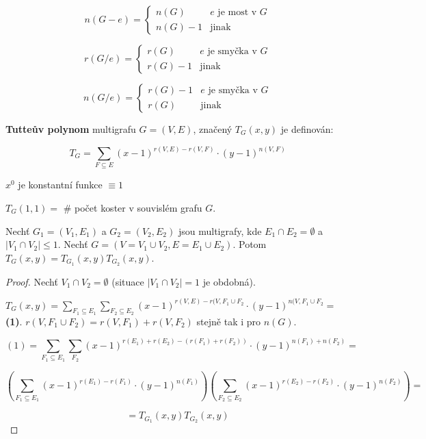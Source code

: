 $$
n(G-e) = 
\left\{
\begin{array}{ll}
	n(G) & e \text{ je most v } G \\
	n(G) - 1 & \text{jinak}
\end{array}
\right.
$$

$$
r(G/e) = 
\left\{
\begin{array}{ll}
	r(G) & e \text{ je smyčka v } G \\
	r(G)-1 & \text{jinak}
\end{array}
\right.
$$

$$
n(G/e) = 
\left\{
\begin{array}{ll}
	r(G)-1 & e \text{ je smyčka v } G \\
	r(G) & \text{jinak}
\end{array}
\right.
$$

\begin{definice}
	\textbf{Tutteův polynom} multigrafu $G=(V,E)$, značený $T_{G}(x,y)$ je definován:
	
	$$
	T_{G} = \sum_{F \subseteq E} (x-1)^{r(V,E)-r(V,F)} \cdot (y-1)^{n(V,F)}
	$$
\end{definice}

\begin{pozn}
	$x^{0}$ je konstantní funkce $\equiv 1$
\end{pozn}

\begin{pozor}
	$T_{G}(1,1) =$ \# počet koster v souvislém grafu $G$.
\end{pozor}

\begin{tvrz}
	Nechť $G_{1} =(V_{1},E_{1})$ a $G_{2} = (V_{2},E_{2})$ jsou multigrafy, kde $E_{1} \cap E_{2} = \emptyset$ a $|V_{1} \cap V_{2}| \leq 1$. Nechť $G = (V = V_{1} \cup V_{2}, E = E_{1} \cup E_{2})$. Potom $T_{G}(x,y) = T_{G_{1}}(x,y)T_{G_{2}}(x,y)$.
\end{tvrz}

\begin{proof}
	Nechť $V_{1} \cap V_{2} = \emptyset$ (situace $|V_{1} \cap V_{2}| = 1$ je obdobná).
	
	$T_{G}(x,y) = \sum_{F_{1} \subseteq E_{1}} \sum_{F_{2} \subseteq E_{2}} (x-1)^{r(V,E) - r(V, F_{1} \cup F_{2}} \cdot (y-1)^{n(V,F_{1} \cup F_{2}} =$ \textbf{(1)}. $r(V, F_{1} \cup F_{2}) = r(V,F_{1}) + r(V,F_{2})$ stejně tak i pro $n(G)$.
	
	$$
	(1) = \sum_{F_{1} \subseteq E_{1}} \sum_{F_{2}} (x-1)^{r(E_{1})+r(E_{2}) - (r(F_{1}) + r(F_{2}))} \cdot (y-1)^{n(F_{1}) + n(F_{2})} =
	$$
	
	$$
	\left( \sum_{F_{1}\subseteq E_{1}} (x-1)^{r(E_{1}) - r(F_{1})} \cdot (y-1)^{n(F_{1})}\right) \left( \sum_{F_{2}\subseteq E_{2}} (x-1)^{r(E_{2}) - r(F_{2})} \cdot (y-1)^{n(F_{2})} \right) =
	$$
	
	$$
	=T_{G_{1}}(x,y) T_{G_{2}}(x,y)
	$$
\end{proof}

